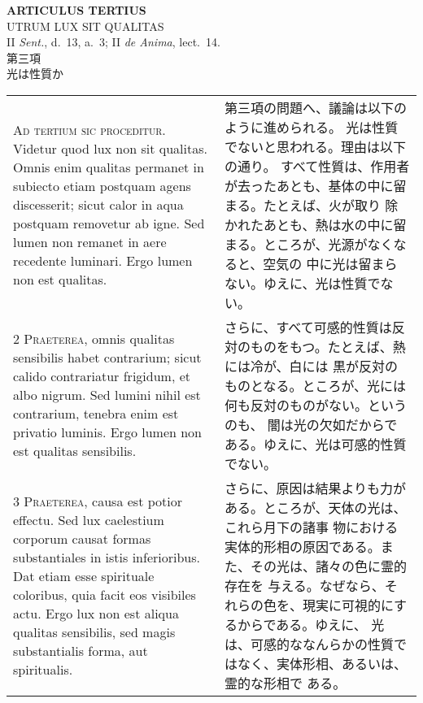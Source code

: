 \documentclass[10pt]{jsarticle} %
\begin{document}
\begin{center}
 {\Large {\bf ARTICULUS TERTIUS}}\\
 {\large UTRUM LUX SIT QUALITAS}\\
 {\footnotesize II {\itshape Sent.}, d.~13, a.~3; II {\itshape de
 Anima}, lect.~14.}\\
 {\Large 第三項\\光は性質か}
\end{center}

\begin{longtable}{p{21em}p{21em}}



{\huge A}{\scshape d tertium sic proceditur}. Videtur quod lux
non sit qualitas. Omnis enim qualitas permanet in subiecto etiam
postquam agens discesserit; sicut calor in aqua postquam removetur ab
igne. Sed lumen non remanet in aere recedente luminari. Ergo lumen non
est qualitas.

&

第三項の問題へ、議論は以下のように進められる。
光は性質でないと思われる。理由は以下の通り。
すべて性質は、作用者が去ったあとも、基体の中に留まる。たとえば、火が取り
 除かれたあとも、熱は水の中に留まる。ところが、光源がなくなると、空気の
 中に光は留まらない。ゆえに、光は性質でない。

\\


{\scshape 2 Praeterea}, omnis qualitas sensibilis habet
contrarium; sicut calido contrariatur frigidum, et albo nigrum. Sed
lumini nihil est contrarium, tenebra enim est privatio luminis. Ergo
lumen non est qualitas sensibilis.

&
さらに、すべて可感的性質は反対のものをもつ。たとえば、熱には冷が、白には
 黒が反対のものとなる。ところが、光には何も反対のものがない。というのも、
 闇は光の欠如だからである。ゆえに、光は可感的性質でない。

\\


{\scshape 3 Praeterea}, causa est potior effectu. Sed
lux caelestium corporum causat formas substantiales in istis
inferioribus. Dat etiam esse spirituale coloribus, quia facit eos
visibiles actu. Ergo lux non est aliqua qualitas sensibilis, sed magis
substantialis forma, aut spiritualis.

&


さらに、原因は結果よりも力がある。ところが、天体の光は、これら月下の諸事
 物における実体的形相の原因である。また、その光は、諸々の色に霊的存在を
 与える。なぜなら、それらの色を、現実に可視的にするからである。ゆえに、
 光は、可感的ななんらかの性質ではなく、実体形相、あるいは、霊的な形相で
 ある。


\end{longtable}
\end{document}
